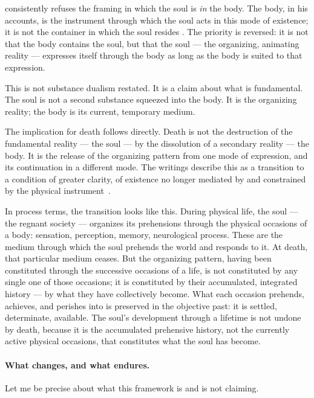 \AbdulBaha{} consistently refuses the framing in which the soul is
\emph{in} the body.
The body, in his accounts, is the instrument through which the soul acts in
this mode of existence; it is not the container in which the soul resides
\citep[see, e.g.,][]{SAQ}.
The priority is reversed: it is not that the body contains the soul, but
that the soul --- the organizing, animating reality --- expresses itself
through the body as long as the body is suited to that expression.

This is not substance dualism restated.
It is a claim about what is fundamental.
The soul is not a second substance squeezed into the body.
It is the organizing reality; the body is its current, temporary medium.

The implication for death follows directly.
Death is not the destruction of the fundamental reality --- the soul ---
by the dissolution of a secondary reality --- the body.
It is the release of the organizing pattern from one mode of expression,
and its continuation in a different mode.
The \bahai{} writings describe this as a transition to a condition of greater
clarity, of existence no longer mediated by and constrained by the physical
instrument~\citep{GleaningsBahaullah}.

In process terms, the transition looks like this.
During physical life, the soul --- the regnant society --- organizes its
prehensions through the physical occasions of a body: sensation, perception,
memory, neurological process.
These are the medium through which the soul prehends the world and responds
to it.
At death, that particular medium ceases.
But the organizing pattern, having been constituted through the successive
occasions of a life, is not constituted by any single one of those occasions;
it is constituted by their accumulated, integrated history --- by what they
have collectively become.
What each occasion prehends, achieves, and perishes into is preserved in
the objective past: it is settled, determinate, available.
The soul's development through a lifetime is not undone by death, because
it is the accumulated prehensive history, not the currently active physical
occasions, that constitutes what the soul has become.

\paragraph{What changes, and what endures.}

Let me be precise about what this framework is and is not claiming.

